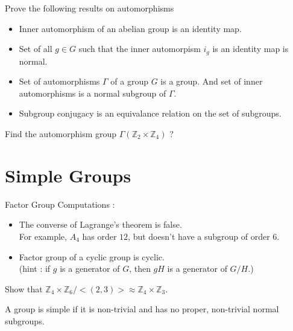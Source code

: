 \begin{remark}Prove the following results on automorphisms 
	\begin{itemize}
		\item Inner automorphism of an abelian group is an identity map.%
		\item Set of all $g \in G$ such that the inner automorpism $i_g$ is an identity map is normal.%
		\item Set of automorphisms $\Gamma$ of a group $G$ is a group.
			And set of inner automorphisms is a normal subgroup of $\Gamma$.
		\item Subgroup conjugacy is an equivalance relation on the set of subgroups.%
	\end{itemize}
\end{remark}
\begin{question}
	Find the automorphism group $\Gamma(\mathbb{Z}_2 \times \mathbb{Z}_4)$ ?
\end{question}

\section{Simple Groups}
\begin{remark}Factor Group Computations :
	\begin{itemize}
		\item The converse of Lagrange's theorem is false.\\
			For example, $A_4$ has order $12$, but doesn't have a subgroup of order $6$.
		\item Factor group of a cyclic group is cyclic.\\
			(hint : if $g$ is a generator of $G$, then $gH$ is a generator of $G/H$.)
	\end{itemize}
\end{remark}

\begin{question}
	Show that $\mathbb{Z}_4 \times \mathbb{Z}_6 / <(2,3)> \approx \mathbb{Z}_4 \times \mathbb{Z}_3$.
\end{question}

\begin{definition}
	A group is simple if it is non-trivial and has no proper, non-trivial normal subgroups.
\end{definition}

